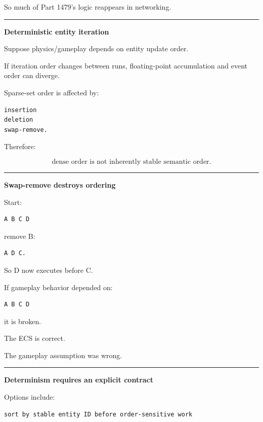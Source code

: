 So much of Part 1479's logic reappears in networking.

\begin{center}\rule{0.5\linewidth}{0.5pt}\end{center}

\textbf{Deterministic entity iteration}

Suppose physics/gameplay depends on entity update order.

If iteration order changes between runs, floating-point accumulation and event order can diverge.

Sparse-set order is affected by:

\begin{verbatim}
insertion
deletion
swap-remove.
\end{verbatim}

Therefore:

\[
\boxed{
\text{dense order is not inherently stable semantic order}.
}
\]

\begin{center}\rule{0.5\linewidth}{0.5pt}\end{center}

\textbf{Swap-remove destroys ordering}

Start:

\begin{verbatim}
A B C D
\end{verbatim}

remove B:

\begin{verbatim}
A D C.
\end{verbatim}

So D now executes before C.

If gameplay behavior depended on:

\begin{verbatim}
A B C D
\end{verbatim}

it is broken.

The ECS is correct.

The gameplay assumption was wrong.

\begin{center}\rule{0.5\linewidth}{0.5pt}\end{center}

\textbf{Determinism requires an explicit contract}

Options include:

\begin{verbatim}
sort by stable entity ID before order-sensitive work
\end{verbatim}

